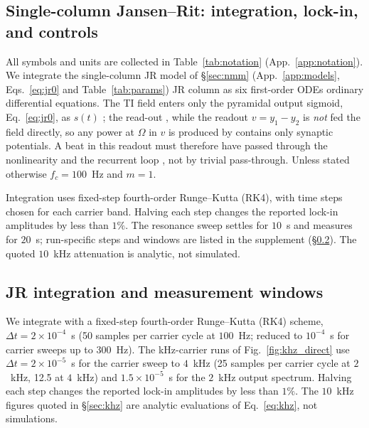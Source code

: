 \documentclass[11pt,a4paper]{article}
\newif\ifjne
\providecommand{\DIFaddtex}[1]{{\protect\color{blue} \sf #1}} %
\providecommand{\DIFdeltex}[1]{{\protect\color{red} \scriptsize #1}} %
\providecommand{\DIFaddbegin}{} %
\providecommand{\DIFaddend}{} %
\providecommand{\DIFdelbegin}{} %
\providecommand{\DIFdelend}{} %
\providecommand{\DIFadd}[1]{\texorpdfstring{\DIFaddtex{#1}}{#1}} %
\providecommand{\DIFdel}[1]{\texorpdfstring{\DIFdeltex{#1}}{}} %
\begin{document}
\DIFaddbegin \fi

\DIFaddend \subsection{Single-column Jansen--Rit: integration, lock-in, and controls}\label{sec:jr-methods}
\DIFdelbegin \DIFdel{All symbols and units are collected in Table~\ref{tab:notation}
(App.~\ref{app:notation}). }\DIFdelend We integrate the \DIFdelbegin \DIFdel{single-column JR model of \S\ref{sec:nmm}
(App.~\ref{app:models}, Eqs.~\eqref{eq:jr0} and Table~\ref{tab:params}) }\DIFdelend \DIFaddbegin \DIFadd{JR column }\DIFaddend as six first-order \DIFdelbegin \DIFdel{ODEs}\DIFdelend \DIFaddbegin \DIFadd{ordinary differential equations}\DIFaddend . The TI field enters only the pyramidal output sigmoid, Eq.~\eqref{eq:jr0},
as $s(t)$\DIFdelbegin \DIFdel{; the read-out }\DIFdelend \DIFaddbegin \DIFadd{, while the readout }\DIFaddend $v=y_1-y_2$ \DIFdelbegin \DIFdel{is \emph{not} fed the field directly, so any
power at $\Omega$ in $v$ is produced by }\DIFdelend \DIFaddbegin \DIFadd{contains only synaptic potentials.
A beat in this readout must therefore have passed through }\DIFaddend the nonlinearity
and the recurrent loop\DIFdelbegin \DIFdel{,
not by trivial pass-through}\DIFdelend . Unless stated otherwise $f_c=100$~Hz and $m=1$.

\DIFaddbegin \DIFadd{Integration uses fixed-step fourth-order Runge--Kutta (RK4), with time steps
chosen for each carrier band. Halving each step changes the reported lock-in
amplitudes by less than $1\%$. The resonance sweep settles for $10$~s and measures
for $20$~s; run-specific steps and windows are listed in the supplement
(\S\ref{supp:jr-runs}). The quoted $10$~kHz attenuation is analytic, not simulated.
}\ifjne\else
\subsection{\DIFadd{JR integration and measurement windows}}\label{supp:jr-runs}
\DIFaddend We integrate with a fixed-step fourth-order Runge--Kutta (RK4) scheme,
$\Delta t=2\times10^{-4}$~s (50 samples per carrier cycle at $100$~Hz; reduced to
$10^{-4}$~s for carrier sweeps up to $300$~Hz). The kHz-carrier runs of
Fig.~\ref{fig:khz_direct} use $\Delta t=2\times10^{-5}$~s for the carrier sweep to
$4$~kHz (25 samples per carrier cycle at $2$~kHz, 12.5 at $4$~kHz) and
$1.5\times10^{-5}$~s for the $2$~kHz output spectrum. Halving each step changes the
reported lock-in amplitudes by less than $1\%$. The $10$~kHz figures quoted in
\S\ref{sec:khz} are analytic evaluations of Eq.~\eqref{eq:khz}, not simulations.
\end{document}
